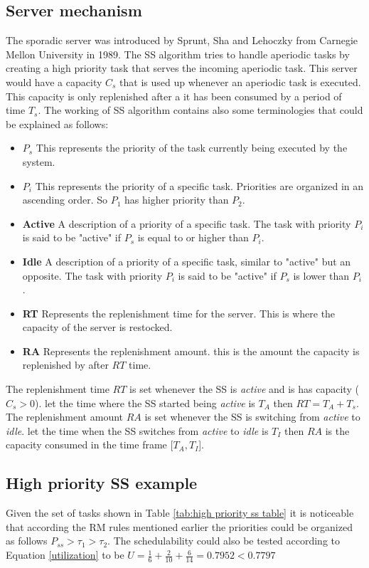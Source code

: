 \documentclass[conference]{IEEEtran}
\begin{document}
\subsection{Server mechanism}
The sporadic server was introduced by Sprunt, Sha and Lehoczky from Carnegie Mellon University in 1989. The SS algorithm tries to handle aperiodic tasks by creating a high priority task that serves the  incoming aperiodic task. This server would have a capacity ${C_s}$ that is used up whenever an aperiodic task is executed. This capacity is only replenished after a it has been consumed by a period of time $T_s$. The working of SS algorithm contains also some terminologies\cite{SpruntoSS} that could be explained as follows:
\begin{itemize}
    \item \textbf{$P_s$} This represents the priority of the task currently being executed by the system.
    \item \textbf{$P_i$} This represents the priority of a specific task. Priorities are organized in an ascending order. So $P_1$ has higher priority than $P_2$.
    \item \textbf{Active} A description of a priority of a specific task. The task with priority $P_i$ is said to be "active" if $P_s$ is equal to or higher than $P_i$.
    \item \textbf{Idle} A description of a priority of a specific task, similar to "active" but an opposite. The task with priority $P_i$ is said to be "active" if $P_s$ is lower than $P_i$.
    \item \textbf{RT} Represents the replenishment time for the server. This is where the capacity of the server is restocked.
    \item \textbf{RA} Represents the replenishment amount. this is the amount the capacity is replenished by after $RT$ time.
\end{itemize}
The replenishment time $RT$ is set whenever the SS is \textit{active} and is has capacity ($C_s>0$). let the time where the SS started being \textit{active} is $T_A$ then $RT = T_A + T_s$.
The replenishment amount $RA$ is set whenever the SS is switching from \textit{active} to \textit{idle}. let the time when the SS switches from \textit{active} to \textit{idle} is $T_I$ then $RA$ is the capacity consumed in the time frame [$T_A,T_I$].
\subsection{High priority SS example}
Given the set of tasks shown in Table \ref{tab:high priority ss table} it is noticeable that according the RM rules mentioned earlier the priorities could be organized as follows $P_{ss}> \tau_1>\tau_2$. The schedulability could also be tested according to Equation \ref{utilization} to be $U=\frac{1}{6}+\frac{2}{10}+\frac{6}{14}=0.7952 < 0.7797$ 
\end{document}
